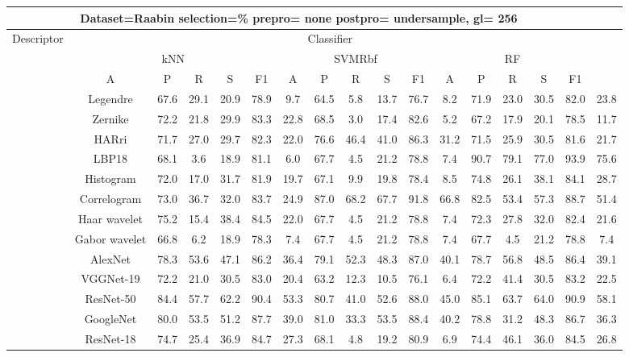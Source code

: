\documentclass[12pt,italian]{article}
\begin{document}
\begin{tiny}
\begin{longtable}{lcccccccccccccccc}
\toprule
\multicolumn{16}{c}{Dataset=Raabin selection=\% prepro= none postpro= undersample, gl= 256} \\ 
\toprule
Descriptor & \multicolumn{15}{c}{Classifier} \\ 
& \multicolumn{5}{c}{kNN} & \multicolumn{5}{c}{SVMRbf} & \multicolumn{5}{c}{RF} \\ 
& A & P & R & S & F1 & A & P & R & S & F1 & A & P & R & S & F1 \\ 
\midrule
& Legendre & 67.6 & 29.1 & 20.9 & 78.9 &  9.7 & 64.5 &  5.8 & 13.7 & 76.7 &  8.2 & 71.9 & 23.0 & 30.5 & 82.0 & 23.8 \\ 
& Zernike & 72.2 & 21.8 & 29.9 & 83.3 & 22.8 & 68.5 &  3.0 & 17.4 & 82.6 &  5.2 & 67.2 & 17.9 & 20.1 & 78.5 & 11.7 \\ 
& HARri & 71.7 & 27.0 & 29.7 & 82.3 & 22.0 & 76.6 & 46.4 & 41.0 & 86.3 & 31.2 & 71.5 & 25.9 & 30.5 & 81.6 & 21.7 \\ 
& LBP18 & 68.1 &  3.6 & 18.9 & 81.1 &  6.0 & 67.7 &  4.5 & 21.2 & 78.8 &  7.4 & 90.7 & 79.1 & 77.0 & 93.9 & 75.6 \\ 
& Histogram & 72.0 & 17.0 & 31.7 & 81.9 & 19.7 & 67.1 &  9.9 & 19.8 & 78.4 &  8.5 & 74.8 & 26.1 & 38.1 & 84.1 & 28.7 \\ 
& Correlogram & 73.0 & 36.7 & 32.0 & 83.7 & 24.9 & 87.0 & 68.2 & 67.7 & 91.8 & 66.8 & 82.5 & 53.4 & 57.3 & 88.7 & 51.4 \\ 
& Haar wavelet & 75.2 & 15.4 & 38.4 & 84.5 & 22.0 & 67.7 &  4.5 & 21.2 & 78.8 &  7.4 & 72.3 & 27.8 & 32.0 & 82.4 & 21.6 \\ 
& Gabor wavelet & 66.8 &  6.2 & 18.9 & 78.3 &  7.4 & 67.7 &  4.5 & 21.2 & 78.8 &  7.4 & 67.7 &  4.5 & 21.2 & 78.8 &  7.4 \\ 
& AlexNet & 78.3 & 53.6 & 47.1 & 86.2 & 36.4 & 79.1 & 52.3 & 48.3 & 87.0 & 40.1 & 78.7 & 56.8 & 48.5 & 86.4 & 39.1 \\ 
& VGGNet-19 & 72.2 & 21.0 & 30.5 & 83.0 & 20.4 & 63.2 & 12.3 & 10.5 & 76.1 &  6.4 & 72.2 & 41.4 & 30.5 & 83.2 & 22.5 \\ 
& ResNet-50 & 84.4 & 57.7 & 62.2 & 90.4 & 53.3 & 80.7 & 41.0 & 52.6 & 88.0 & 45.0 & 85.1 & 63.7 & 64.0 & 90.9 & 58.1 \\ 
& GoogleNet & 80.0 & 53.5 & 51.2 & 87.7 & 39.0 & 81.0 & 33.3 & 53.5 & 88.4 & 40.2 & 78.8 & 31.2 & 48.3 & 86.7 & 36.3 \\ 
& ResNet-18 & 74.7 & 25.4 & 36.9 & 84.7 & 27.3 & 68.1 &  4.8 & 19.2 & 80.9 &  6.9 & 74.4 & 46.1 & 36.0 & 84.5 & 26.8 \\ 

\end{longtable}
\end{tiny}
\end{document}
